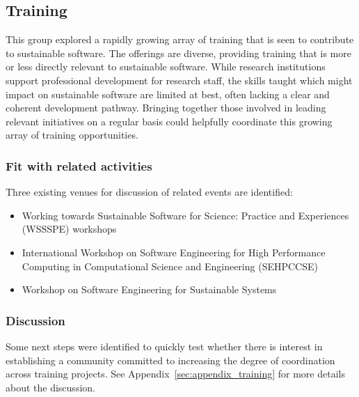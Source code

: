 \subsection{Training}


This group explored a rapidly growing array of training that is seen to
contribute to sustainable software. The offerings are diverse, providing
training that is more or less directly relevant to sustainable software. While
research institutions support professional development for research staff, the
skills taught which might impact on sustainable software are limited at best,
often lacking a clear and coherent development pathway. Bringing together those
involved in leading relevant initiatives on a regular basis could helpfully
coordinate this growing array of training opportunities.

\subsubsection{Fit with related activities} 

Three existing venues for discussion of related events are
identified:
%
\begin{itemize}

\item Working towards Sustainable Software for Science: Practice and
Experiences (WSSSPE) workshops~\cite{WSSSPE}

\item International Workshop on Software Engineering for High
Performance Computing in Computational Science and
Engineering (SEHPCCSE)~\cite{SEHPCCSE}

\item Workshop on Software Engineering for Sustainable Systems~\cite{se4susy}

\end{itemize}

\subsubsection{Discussion}

Some next steps were identified to quickly test whether there is interest in
establishing a community committed to increasing the degree of coordination
across training projects. See Appendix~\ref{sec:appendix_training} for more
details about the discussion.

